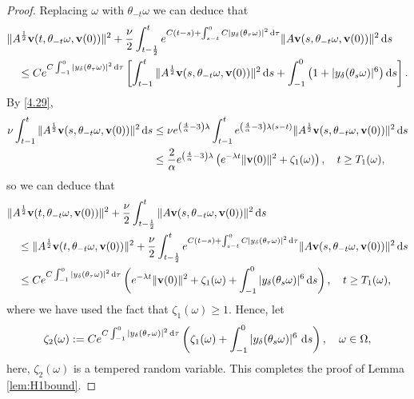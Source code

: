 \documentclass{elsarticle}
\theoremstyle{definition}
\numberwithin{equation}{section}
\renewcommand{\d}{{\rm{d}}}
\begin{document}
\begin{proof}
Replacing $\omega$ with $\theta_{-t}\omega$ we can deduce that
\begin{align*}
&   \|A^{\frac12}\textbf{v}(t,\theta_{-t}\omega, \textbf{v}(0) )\|^2
+   \frac{\nu}{2} \int_{t-\frac 12 }^te^{ C(t-s) + \int_{s-t}^0C |y_{\delta}(\theta_\tau\omega)|^2 \, \d \tau}\|A\textbf{v}(s ,\theta_{-t}\omega, \textbf{v}(0))\|^2\, \d s\nonumber\\
&\quad  \leq  C e^{ C \int_{-1}^0 |y_{\delta}(\theta_\tau\omega)|^2\, \d \tau}
\left [ \int_{t-1}^t   \|A^{\frac12}\textbf{v}(s,\theta_{-t}\omega, \textbf{v}(0) )\|^2\, \d s+\int_{-1}^0 \left(1+ |y_{\delta}(\theta_{s} \omega)|^6  \right)  \d s\right].
\end{align*}
By     \eqref{4.29},
\begin{align*}
 \nu  \int_{t-1}^t  \|A^{\frac12}\textbf{v}(s,\theta_{-t}\omega, \textbf{v}(0) )\|^2  \, \d s
 & \leq   \nu e^{\left( \frac 4\alpha -3 \right)  \lambda }   \int_{t-1}^t  e^{\left( \frac 4\alpha -3 \right)  \lambda (s-t) } \|A^{\frac12}\textbf{v}(s,\theta_{-t}\omega, \textbf{v}(0) )\|^2 \, \d s
 \\
 & \leq  \frac{2}{\alpha    }   e^{\left( \frac 4\alpha -3 \right)  \lambda }   \left( e^{-\lambda t}\|\textbf{v}(0)\|^2
 +   \zeta_1(\omega)\right) , \quad    t\geq T_1(\omega) , \nonumber
\end{align*}
so
we can deduce that
\begin{align*}
&   \|A^{\frac12}\textbf{v}(t,\theta_{-t}\omega, \textbf{v}(0) )\|^2
 +  \frac{\nu}{2} \int_{t-\frac 12 }^t  \|A\textbf{v}(s ,\theta_{-t}\omega, \textbf{v}(0))\|^2\, \d s \nonumber\\
 &\quad  \leq  \|A^{\frac12}\textbf{v}(t,\theta_{-t}\omega, \textbf{v}(0) )\|^2
+  \frac{\nu}{2} \int_{t-\frac 12 }^te^{ C(t-s) + \int_{s-t}^0C |y_{\delta}(\theta_\tau\omega)|^2 \, \d \tau}\|A\textbf{v}(s ,\theta_{-t}\omega, \textbf{v}(0))\|^2\, \d s\nonumber\\
&\quad \leq   C e^{ C \int_{-1}^0 |y_{\delta} (\theta_\tau\omega)|^2\, \d \tau} \left(   e^{-\lambda t}\|\textbf{v}(0)\|^2
 +   \zeta_1(\omega)  +
\int_{-1}^0 |y_{\delta}(\theta_{s} \omega)|^6  \, \d s \right) , \quad    t\geq T_1(\omega) ,
\end{align*}
where  we have used the fact  that $\zeta_1(\omega)\geq 1$.
Hence, let
\begin{align}\label{mar8.8}
 \zeta_2(\omega) :=   C e^{ C \int_{-1}^0 |y_{\delta}(\theta_\tau\omega)|^2\, \d \tau} \left(      \zeta_1(\omega)  +
\int_{-1}^0 |y_{\delta}(\theta_{s} \omega)|^6   \ \d s \right) ,
\quad \omega\in \Omega,
\end{align}
here, $\zeta_2(\omega)$ is a tempered random variable.  This completes the proof of Lemma \ref{lem:H1bound}.


\end{proof}
\end{document}
